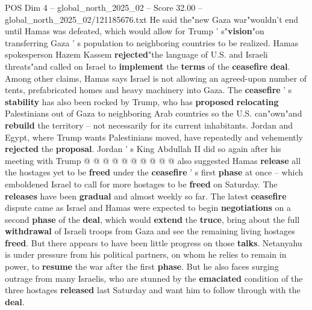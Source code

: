 \begin{textsample}{POS Dim 4 – global\_north\_2025\_02 – Score 32.00 – global\_north\_2025\_02/121185676.txt}
He said the"new Gaza war"wouldn't end until Hamas was defeated, which would allow for Trump ' s"\textbf{vision}"on transferring Gaza ' s population to neighboring countries to be realized.
Hamas spokesperson Hazem Kassem \textbf{rejected}"the language of U.S. and Israeli threats"and called on Israel to \textbf{implement} the \textbf{terms} of the \textbf{ceasefire} \textbf{deal}.
Among other claims, Hamas says Israel is not allowing an agreed-upon number of tents, prefabricated homes and heavy machinery into Gaza.
The \textbf{ceasefire} ' s \textbf{stability} has also been rocked by Trump, who has \textbf{proposed} \textbf{relocating} Palestinians out of Gaza to neighboring Arab countries so the U.S. can"own"and \textbf{rebuild} the territory -- not necessarily for its current inhabitants.
Jordan and Egypt, where Trump wants Palestinians moved, have repeatedly and vehemently \textbf{rejected} the \textbf{proposal}.
Jordan ' s King Abdullah II did so again after his meeting with Trump @ @ @ @ @ @ @ @ @ @ also suggested Hamas \textbf{release} all the hostages yet to be \textbf{freed} under the \textbf{ceasefire} ' s first \textbf{phase} at once -- which emboldened Israel to call for more hostages to be \textbf{freed} on Saturday.
The \textbf{releases} have been \textbf{gradual} and almost weekly so far.
The latest \textbf{ceasefire} dispute came as Israel and Hamas were expected to begin \textbf{negotiations} on a second \textbf{phase} of the \textbf{deal}, which would \textbf{extend} the \textbf{truce}, bring about the full \textbf{withdrawal} of Israeli troops from Gaza and see the remaining living hostages \textbf{freed}.
But there appears to have been little progress on those \textbf{talks}.
Netanyahu is under pressure from his political partners, on whom he relies to remain in power, to \textbf{resume} the war after the first \textbf{phase}.
But he also faces surging outrage from many Israelis, who are stunned by the \textbf{emaciated} condition of the three hostages \textbf{released} last Saturday and want him to follow through with the \textbf{deal}.

\end{textsample}
